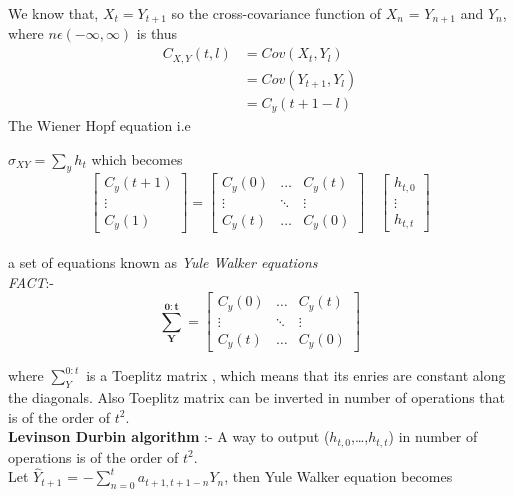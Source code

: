 \documentclass[11pt]{article}
\begin{document}
We know that, $X_t = Y_{t + 1}$ so the cross-covariance function of {$X_n$} = $Y_{n+1}$ and {$Y_n$}, where $n \epsilon(-\infty,\infty)$ is thus\\
\begin{align*}
C_{X,Y}(t,l) &= Cov(X_t,Y_l) \\
& =  Cov(Y_{t+1},Y_l) \\
& = C_y(t+1-l)
\end{align*}
The Wiener Hopf equation i.e {$\sigma_{XY} = \sum_yh_t$ which becomes 
\[
\begin{bmatrix}
C_y(t+1)\\
\vdots\\
C_y(1)
\end{bmatrix}
=
\begin{bmatrix}
C_y(0) & \ldots & C_y(t)\\
\vdots & \ddots & \vdots\\
C_y(t) & \ldots & C_y(0)
\end{bmatrix}
\quad
\begin{bmatrix}
h_{t,0}\\
\vdots\\
h_{t,t}
\end{bmatrix}
\]\\
a set of equations known as \emph{Yule Walker equations}\\


\emph{FACT}:-\\
\begin{equation*}
\mathbf{\sum_{Y}^{0:t}} =
\begin{bmatrix}
C_y(0) & \ldots & C_y(t)\\
\vdots & \ddots & \vdots\\
C_y(t) & \ldots & C_y(0)
\end{bmatrix}
\end{equation*}

where $\sum_{Y}^{0:t}$ is a Toeplitz matrix , which means that its enries are constant along the diagonals. Also Toeplitz matrix can be inverted in number of operations that is of the order of $t^2$.\\


\textbf{Levinson Durbin algorithm} :- A way to output ($h_{t,0}$,\ldots,$h_{t,t}$) in number of operations is of the order of $t^2$.\\

Let  $\hat{Y}_{t+1}$ = $-\sum_{n=0}^t a_{{t+1},{t+1-n}}Y_n$, then Yule Walker equation becomes\\

}
\end{document}
